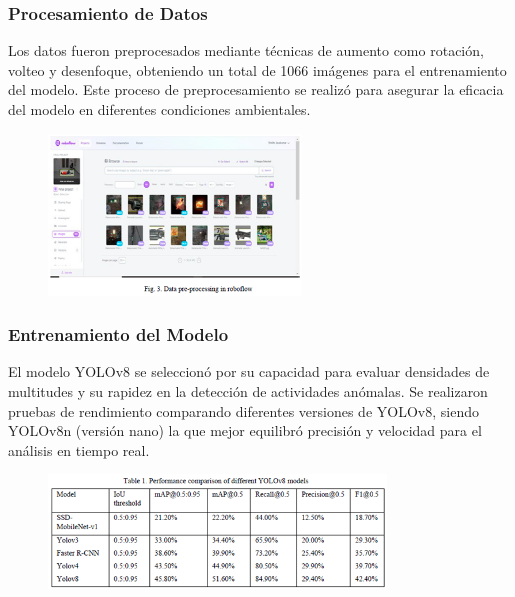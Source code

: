 \subsubsection{Procesamiento de Datos}
Los datos fueron preprocesados mediante técnicas de aumento como rotación, volteo y desenfoque, obteniendo un total de 1066 imágenes para el entrenamiento del modelo. Este proceso de preprocesamiento se realizó para asegurar la eficacia del modelo en diferentes condiciones ambientales.

\begin{figure}[h] %
    \centering
    \includegraphics[width=0.6\textwidth]{4/pro1.png} %
    \label{fig:ejemplo} %
\end{figure}

\subsubsection{Entrenamiento del Modelo}
El modelo YOLOv8 se seleccionó por su capacidad para evaluar densidades de multitudes y su rapidez en la detección de actividades anómalas. Se realizaron pruebas de rendimiento comparando diferentes versiones de YOLOv8, siendo YOLOv8n (versión nano) la que mejor equilibró precisión y velocidad para el análisis en tiempo real.

\begin{figure}[h] %
    \centering
    \includegraphics[width=0.8\textwidth]{4/tab1.1.png} %
    \label{fig:ejemplo} %
\end{figure}

